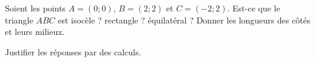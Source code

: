 
\begin{exercice}\label{exoSeconde-0006}

    Soient les points \( A=(0;0)\), \( B=(2;2)\) et \( C=(-2;2)\). Est-ce que le triangle \( ABC\) est isocèle ? rectangle ? équilatéral ? Donner les longueurs des côtés et leurs milieux.

    Justifier les réponses par des calculs.

\end{exercice}

